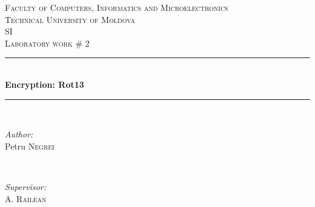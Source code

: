 \documentclass{article}
\begin{document}
  \begin{titlepage}

 \newcommand{\HRule}{\rule{\linewidth}{0.5mm}} %
  \begin{center} %

  \textsc{\Large Faculty of Computers, Informatics and Microelectronics}\\[0.5cm]
  \textsc{\LARGE Technical University of Moldova}\\[1.2cm] %
  \vspace{25 mm}
  \textsc{\Large SI}\\[0.5cm] %
  \textsc{\large Laboratory work \# 2}\\[0.5cm] %

  \vspace{10 mm}
  \HRule \\[0.4cm]
  { \LARGE \bfseries Encryption: Rot13 }\\[0.4cm] %
  \HRule \\[1.5cm]

  \vspace{40mm}

  \begin{minipage}{0.4\textwidth}
  \begin{flushleft} \large
  \emph{Author:}\\
  Petru \textsc{Negrei} %
  \end{flushleft}
  \end{minipage}
  ~
  \begin{minipage}{0.4\textwidth}
  \begin{flushright} \large
  \emph{Supervisor:} \\
  A. \textsc{Railean} %
  \end{flushright}
  \end{minipage}\\[4cm]


\end{center}
\end{titlepage}
\end{document}
